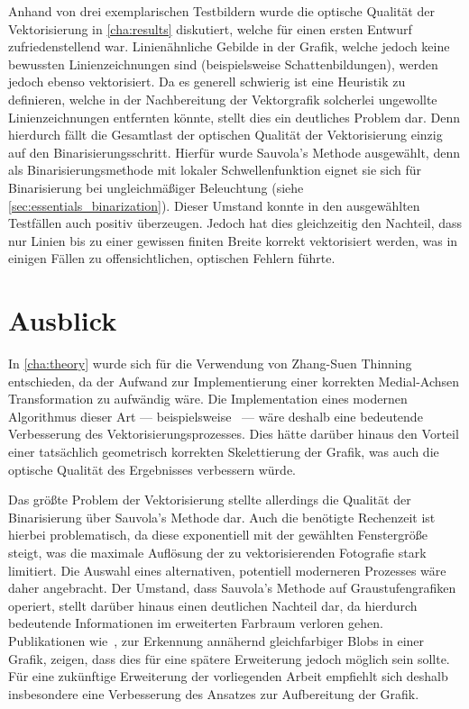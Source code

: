Anhand von drei exemplarischen Testbildern wurde die optische Qualität der Vektorisierung in \autoref{cha:results} diskutiert, welche für einen ersten Entwurf zufriedenstellend war.
Linienähnliche Gebilde in der Grafik, welche jedoch keine bewussten Linienzeichnungen sind (beispielsweise Schattenbildungen), werden jedoch ebenso vektorisiert.
Da es generell schwierig ist eine Heuristik zu definieren, welche in der Nachbereitung der Vektorgrafik solcherlei ungewollte Linienzeichnungen entfernten könnte, stellt dies ein deutliches Problem dar.
Denn hierdurch fällt die Gesamtlast der optischen Qualität der Vektorisierung einzig auf den Binarisierungsschritt.
Hierfür wurde Sauvola's Methode ausgewählt, denn als Binarisierungsmethode mit lokaler Schwellenfunktion eignet sie sich für Binarisierung bei ungleichmäßiger Beleuchtung (siehe \autoref{sec:essentials_binarization}).
Dieser Umstand konnte in den ausgewählten Testfällen auch positiv überzeugen.
Jedoch hat dies gleichzeitig den Nachteil, dass nur Linien bis zu einer gewissen finiten Breite korrekt vektorisiert werden, was in einigen Fällen zu offensichtlichen, optischen Fehlern führte.

\section{Ausblick}

In \autoref{cha:theory} wurde sich für die Verwendung von Zhang-Suen Thinning entschieden, da der Aufwand zur Implementierung einer korrekten Medial-Achsen Transformation zu aufwändig wäre.
Die Implementation eines modernen Algorithmus dieser Art --- beispielsweise~\cite{DBLP:journals/cg/MonteroL12} --- wäre deshalb eine bedeutende Verbesserung des Vektorisierungsprozesses.
Dies hätte darüber hinaus den Vorteil einer tatsächlich geometrisch korrekten Skelettierung der Grafik, was auch die optische Qualität des Ergebnisses verbessern würde.

Das größte Problem der Vektorisierung stellte allerdings die Qualität der Binarisierung über Sauvola's Methode dar.
Auch die benötigte Rechenzeit ist hierbei problematisch, da diese exponentiell mit der gewählten Fenstergröße steigt, was die maximale Auflösung der zu vektorisierenden Fotografie stark limitiert.
Die Auswahl eines alternativen, potentiell moderneren Prozesses wäre daher angebracht.
Der Umstand, dass Sauvola's Methode auf Graustufengrafiken operiert, stellt darüber hinaus einen deutlichen Nachteil dar, da hierdurch bedeutende Informationen im erweiterten Farbraum verloren gehen.
Publikationen wie~\cite{DBLP:conf/cvpr/Forssen07}, zur Erkennung annähernd gleichfarbiger Blobs in einer Grafik, zeigen, dass dies für eine spätere Erweiterung jedoch möglich sein sollte.
Für eine zukünftige Erweiterung der vorliegenden Arbeit empfiehlt sich deshalb insbesondere eine Verbesserung des Ansatzes zur Aufbereitung der Grafik.
